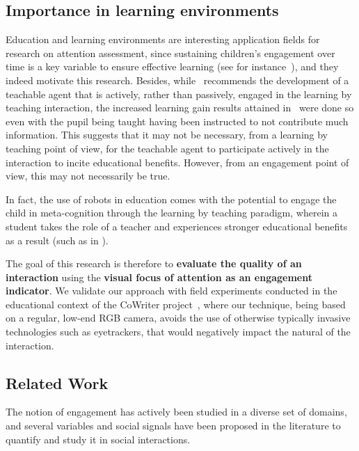 \documentclass{sig-alternate}
\begin{document}
\subsection{Importance in learning environments}

Education and learning environments are interesting application fields for research on attention assessment, since sustaining children's engagement over time is a key variable to ensure
effective learning (see for instance~\cite{Umbach}), and they indeed motivate this research. Besides, while~\cite{zhao2012learning} recommends the development of a teachable agent that is actively, rather than passively, engaged in the learning by teaching interaction, the increased learning gain results attained in~\cite{okita2006observation} were done so even with the pupil being taught having been instructed to not contribute much information. This suggests that it may not be necessary, from a learning by teaching point of view, for the teachable agent to participate actively in the interaction to incite educational benefits. However, from an engagement point of view, this may not necessarily be true.

In fact, the use of robots in education comes with the potential to engage the child in meta-cognition through the learning by teaching paradigm, wherein a student takes the role of a teacher and experiences stronger educational benefits as a result (such as in \cite{Palinscar1984}).

The goal of this research is therefore to \textbf{evaluate the quality of an interaction} using the \textbf{visual focus of attention as an engagement indicator}. We validate our approach with field experiments conducted in the educational context of the CoWriter project~\cite{Hood:2015}, where our technique, being based on a regular, low-end RGB camera, avoids the use of otherwise typically invasive technologies such as eyetrackers, that would negatively impact the natural of the interaction.

\subsection{Related Work}

The notion of engagement has actively been studied in a diverse set of domains, and several variables and social signals have been proposed in the literature to quantify and study it in social interactions.
\end{document}
